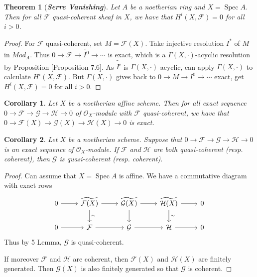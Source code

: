 \documentclass{ctexart}
\newtheorem{theorem}{Theorem}[section]
\newtheorem{corollary}{Corollary}[section]
\newcommand{\spec}{\operatorname{Spec}}
\begin{document}
\begin{theorem}[\textbf{\emph{Serre Vanishing}}]
    Let $A$ be a noetherian ring and $X = \spec A$.
    Then for all $\mathcal{F}$ quasi-coherent sheaf in $X$, we have that $H^{i}(X, \mathcal{F}) = 0$ for all $i > 0$.
    \label{Theorem 7.3}
\end{theorem}
\begin{proof}
    For $\mathcal{F}$ quasi-coherent, set $M = \mathcal{F}(X)$.
    Take injective resolution $I^{\ast}$ of $M$ in $Mod_{A}$.
    Thus $0 \longrightarrow \mathcal{F} \longrightarrow \widetilde{I^{0}} \longrightarrow \cdots$ is exact, which is a $\Gamma(X, \cdot)$-acyclic resolution by Proposition \ref{Proposition 7.6}.
    As $\widetilde{I^{i}}$ is $\Gamma(X, \cdot)$-acyclic, can apply $\Gamma(X, \cdot)$ to calculate $H^{i}(X, \mathcal{F})$.
    But $\Gamma(X, \cdot)$ gives back to $0 \longrightarrow M \longrightarrow I^{0} \longrightarrow \cdots$ exact, get $H^{i}(X, \mathcal{F}) = 0$ for all $i > 0$. 
\end{proof}
\begin{corollary}
    Let $X$ be a noetherian affine scheme.
    Then for all exact sequence $0 \longrightarrow \mathcal{F} \longrightarrow \mathcal{G} \longrightarrow \mathcal{H} \longrightarrow 0$ of $\mathcal{O}_{X}$-module with $\mathcal{F}$ quasi-coherent,
    we have that $0 \longrightarrow \mathcal{F}(X) \longrightarrow \mathcal{G}(X) \longrightarrow \mathcal{H}(X) \longrightarrow 0$ is exact.
    \label{Corollary 7.4}
\end{corollary}
\begin{corollary}
    Let $X$ be a noetherian scheme.
    Suppose that $0 \longrightarrow \mathcal{F} \longrightarrow \mathcal{G} \longrightarrow \mathcal{H} \longrightarrow 0$ is an exact sequence of $\mathcal{O}_{X}$-module.
    If $\mathcal{F}$ and $\mathcal{H}$ are both quasi-coherent (resp. coherent), then $\mathcal{G}$ is quasi-coherent (resp. coherent).
    \label{Corollary 7.5} 
\end{corollary}
\begin{proof}
    Can assume that $X = \spec A$ is affine.
    We have a commutative diagram with exact rows
    \begin{equation*}
        \begin{tikzcd}
            0 \arrow[r] &
            \widetilde{\mathcal{F}(X)} \arrow[r] \arrow[d, "\sim"] &
            \widetilde{\mathcal{G}(X)} \arrow[r] \arrow[d] &
            \widetilde{\mathcal{H}(X)} \arrow[r] \arrow[d, "\sim"] & 
            0 \\
            0 \arrow[r] &
            \mathcal{F} \arrow[r] &
            \mathcal{G} \arrow[r] &
            \mathcal{H} \arrow[r] & 
            0
        \end{tikzcd}
    \end{equation*}
    Thus by 5 Lemma, $\mathcal{G}$ is quasi-coherent.
    \par
    If moreover $\mathcal{F}$ and $\mathcal{H}$ are coherent, then $\mathcal{F}(X)$ and $\mathcal{H}(X)$ are finitely generated.
    Then $\mathcal{G}(X)$ is also finitely generated so that $\mathcal{G}$ is coherent.
\end{proof}
\end{document}
